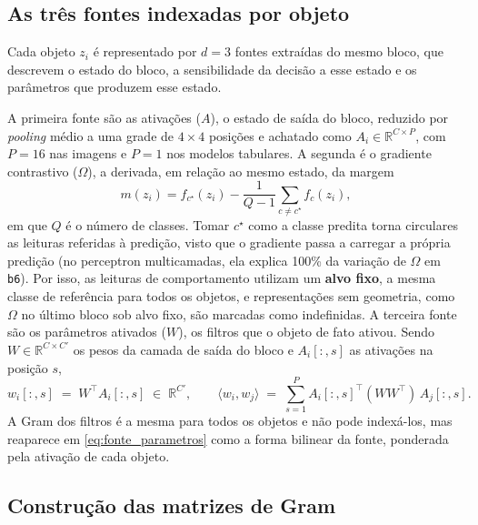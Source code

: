 \subsection{As três fontes indexadas por objeto}\label{subsec:fontes}

Cada objeto $z_i$ é representado por $d = 3$ fontes extraídas do mesmo bloco, que descrevem o estado do bloco, a sensibilidade da decisão a esse estado e os parâmetros que produzem esse estado.

A primeira fonte são as ativações ($A$), o estado de saída do bloco, reduzido por \textit{pooling} médio a uma grade de $4\times4$ posições e achatado como $A_i \in \mathbb{R}^{C \times P}$, com $P = 16$ nas imagens e $P = 1$ nos modelos tabulares. A segunda é o gradiente contrastivo ($\Omega$), a derivada, em relação ao mesmo estado, da margem
\begin{equation}\label{eq:margem}
    m(z_i) = f_{c^\star}(z_i) - \frac{1}{Q-1}\sum_{c \neq c^\star} f_c(z_i),
\end{equation}
em que $Q$ é o número de classes. Tomar $c^\star$ como a classe predita torna circulares as leituras referidas à predição, visto que o gradiente passa a carregar a própria predição (no perceptron multicamadas, ela explica 100\% da variação de $\Omega$ em \texttt{b6}). Por isso, as leituras de comportamento utilizam um \textbf{alvo fixo}, a mesma classe de referência para todos os objetos, e representações sem geometria, como $\Omega$ no último bloco sob alvo fixo, são marcadas como indefinidas. A terceira fonte são os parâmetros ativados ($W$), os filtros que o objeto de fato ativou. Sendo $W \in \mathbb{R}^{C \times C'}$ os pesos da camada de saída do bloco e $A_i[:,s]$ as ativações na posição $s$,
\begin{equation}\label{eq:fonte_parametros}
    w_i[:,s] \;=\; W^\top A_i[:,s] \;\in\; \mathbb{R}^{C'},
    \qquad
    \langle w_i, w_j\rangle \;=\; \sum_{s=1}^{P} A_i[:,s]^\top (WW^\top)\, A_j[:,s] .
\end{equation}
A Gram dos filtros é a mesma para todos os objetos e não pode indexá-los, mas reaparece em \eqref{eq:fonte_parametros} como a forma bilinear da fonte, ponderada pela ativação de cada objeto.

\subsection{Construção das matrizes de Gram}\label{subsec:construcao}

